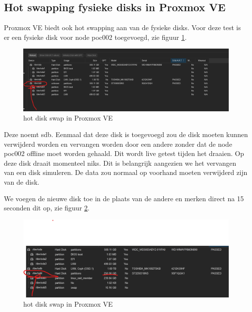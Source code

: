 \subsection{Hot swapping fysieke disks in Proxmox VE}
Proxmox VE biedt ook hot swapping aan van de fysieke disks. 
Voor deze test is er een fysieke disk voor node poc002 toegevoegd, zie figuur \ref{fig:hotdisk-swap}.
\begin{figure}[H]
  \centering
  \includegraphics[width=1.2\textwidth]{../poc/hot-disk-prox.png}
  \caption{hot disk swap in Proxmox VE}
  \label{fig:hotdisk-swap}
\end{figure}
Deze noemt sdb. Eenmaal dat deze disk is toegevoegd zou de disk moeten kunnen verwijderd worden en vervangen worden door een andere zonder dat de node poc002 offline moet worden gehaald.
Dit wordt live getest tijden het draaien. Op deze disk draait momenteel niks. Dit is belangrijk aangezien we het vervangen van een disk simuleren. De data zou normaal op voorhand moeten verwijderd zijn van de disk.

We voegen de nieuwe disk toe in de plaats van de andere en merken direct na 15 seconden dit op, zie figuur \ref{fig:hotdiskvervangen-swap}.
\begin{figure}[H]
  \centering
  \includegraphics[width=1.2\textwidth]{../poc/hot-disktwee-prox.png}
  \caption{hot disk swap in Proxmox VE}
  \label{fig:hotdiskvervangen-swap}
\end{figure}

